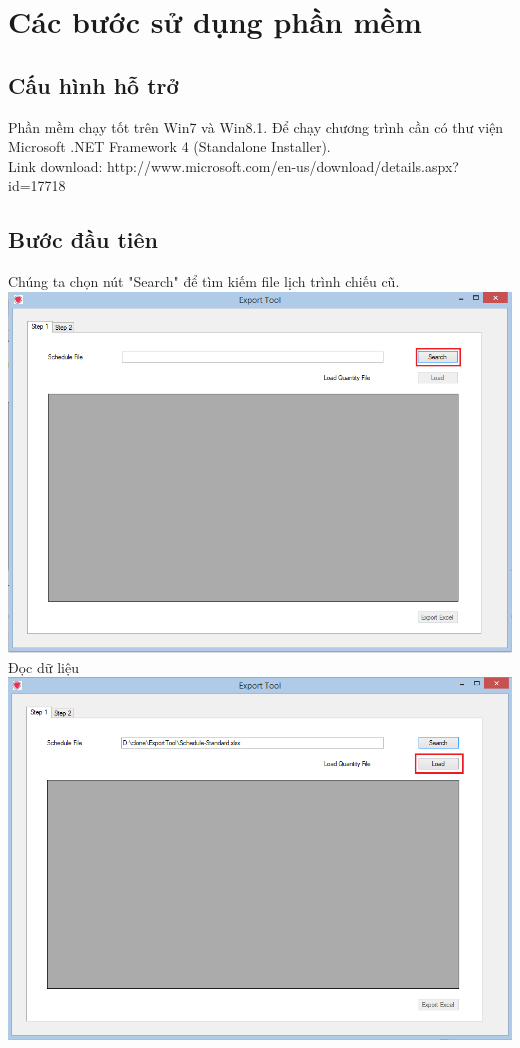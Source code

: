 \documentclass[11pt]{article}
\begin{document}
	\section{Các bước sử dụng phần mềm}
	\subsection{Cấu hình hỗ trở}
	Phần mềm chạy tốt trên Win7 và Win8.1. Để chạy chương trình cần có thư viện Microsoft .NET Framework 4 (Standalone Installer).\\
	Link download: http://www.microsoft.com/en-us/download/details.aspx?id=17718
	\subsection{Bước đầu tiên}
	Chúng ta chọn nút "Search" để tìm kiếm file lịch trình chiếu cũ.\\
	\includegraphics[width=140mm]{im3.png}\\
	Đọc dữ liệu\\
	\includegraphics[width=140mm]{im4.png}\\
\end{document}
